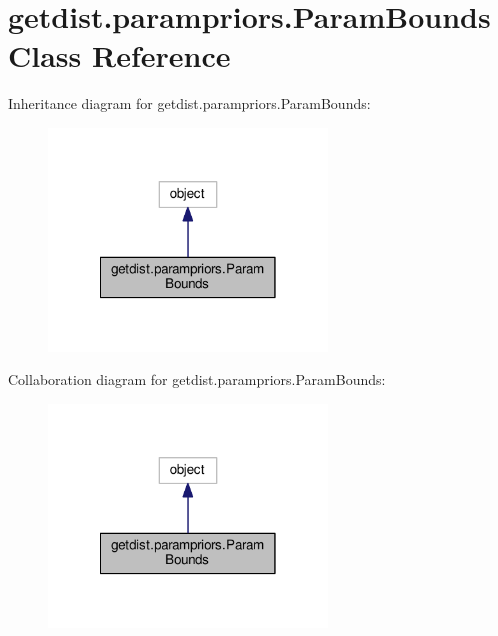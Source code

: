 \hypertarget{classgetdist_1_1parampriors_1_1ParamBounds}{}\section{getdist.\+parampriors.\+Param\+Bounds Class Reference}
\label{classgetdist_1_1parampriors_1_1ParamBounds}


Inheritance diagram for getdist.\+parampriors.\+Param\+Bounds\+:
\nopagebreak
\begin{figure}[H]
\begin{center}
\leavevmode
\includegraphics[width=210pt]{classgetdist_1_1parampriors_1_1ParamBounds__inherit__graph}
\end{center}
\end{figure}


Collaboration diagram for getdist.\+parampriors.\+Param\+Bounds\+:
\nopagebreak
\begin{figure}[H]
\begin{center}
\leavevmode
\includegraphics[width=210pt]{classgetdist_1_1parampriors_1_1ParamBounds__coll__graph}
\end{center}
\end{figure}
